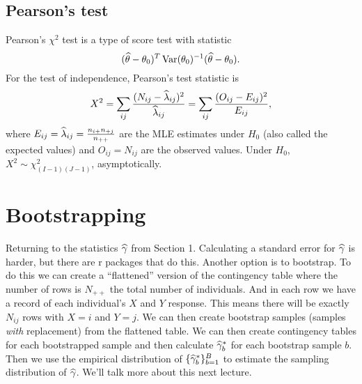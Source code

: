 \subsection{Pearson's test}
Pearson's $\chi^2$ test is a type of score test with statistic 
\[(\widehat{{\theta}}-{\theta}_0)^T \operatorname{Var}({\theta}_0)^{-1}(\widehat{{\theta}}-{\theta}_0). \]
For the test of independence, Pearson's test statistic is 
\begin{align*}
    X^2 = \sum_{ij}\frac{(N_{ij}-\widehat{\lambda}_{ij})^2}{\widehat{\lambda}_{ij}} = \sum_{ij} \frac{(O_{ij}-E_{ij})^2}{E_{ij}},
\end{align*}
where $E_{ij}=\widehat{\lambda}_{ij} = \frac{n_{i+}n_{+j}}{n_{++}}$ are the MLE estimates under $H_0$ (also called the expected values) and $O_{ij}=N_{ij}$ are the observed values. Under $H_0$, $X^2 \sim \chi^2_{(I-1)(J-1)}$, asymptotically. 

\section{Bootstrapping}
Returning to the statistics $\widehat{\gamma}$ from Section 1. Calculating a standard error for $\widehat{\gamma}$ is harder, but there are r packages that do this. Another option is to bootstrap. To do this we can create a ``flattened'' version of the contingency table where the number of rows is $N_{++}$ the total number of individuals. And in each row we have a record of each individual's $X$ and $Y$ response. This means there will be exactly $N_{ij}$ rows with $X=i$ and $Y=j$. We can then create bootstrap samples (samples \emph{with} replacement) from the flattened table. We can then create contingency tables for each bootstrapped sample and then calculate $\widehat{\gamma}^*_b$ for each bootstrap sample $b$. Then we use the empirical distribution of $\{\widehat{\gamma}^*_b\}_{b=1}^B$ to  estimate the sampling distribution of $\widehat{\gamma}$. We'll talk more about this next lecture. 
